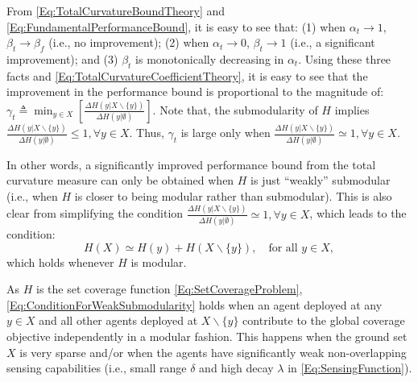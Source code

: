 \documentclass[letterpaper, 10 pt, conference]{ieeeconf}
\begin{document}
From \eqref{Eq:TotalCurvatureBoundTheory} and \eqref{Eq:FundamentalPerformanceBound}, it is easy to see that: 
(1) when $\alpha_t\rightarrow 1$, $\beta_t\rightarrow\beta_f$ (i.e., no improvement); 
(2) when $\alpha_t\rightarrow 0$, $\beta_t\rightarrow 1$ (i.e., a significant improvement); and  
(3) $\beta_t$ is monotonically decreasing in $\alpha_t$. 
Using these three facts and \eqref{Eq:TotalCurvatureCoefficientTheory}, it is easy to see that the improvement in the performance bound is proportional to the magnitude of:
$
    \gamma_t \triangleq \min_{y \in X}\left[\frac{\Delta H(y \vert X \backslash \{y\})}{\Delta H(y \vert \emptyset)}\right].
$
Note that, the submodularity of $H$ implies $\frac{\Delta H(y \vert X \backslash \{y\})}{\Delta H(y \vert \emptyset)} \leq 1, \forall y\in X$. Thus, $\gamma_t$ is large only when $\frac{\Delta H(y \vert X \backslash \{y\})}{\Delta H(y \vert \emptyset)} \simeq 1, \forall y\in X$. 

In other words, a significantly improved performance bound from the total curvature measure can only be obtained when $H$ is just ``weakly'' submodular (i.e., when $H$ is closer to being modular rather than submodular). This is also clear from simplifying the condition $\frac{\Delta H(y \vert X \backslash \{y\})}{\Delta H(y \vert \emptyset)} \simeq 1, \forall y \in X$, which leads to the condition:
\begin{equation}
\label{Eq:ConditionForWeakSubmodularity}
     H(X) \simeq H(y) + H(X\backslash \{y\}), \quad \mbox{for all } y\in X,
\end{equation}
which holds whenever $H$ is modular. 

As $H$ is the set coverage function \eqref{Eq:SetCoverageProblem}, \eqref{Eq:ConditionForWeakSubmodularity} holds when an agent deployed at any $y\in X$ and all other agents deployed at $X \backslash \{y\}$ contribute to the global coverage objective independently in a modular fashion. This happens when the ground set $X$ is very sparse and/or when the agents have significantly weak non-overlapping sensing capabilities (i.e., small range $\delta$ and high decay $\lambda$ in \eqref{Eq:SensingFunction}). 
\end{document}
